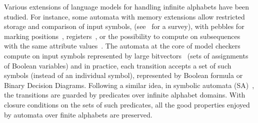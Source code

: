 \documentclass[runningheads]{llncs}
\def\SA{\textsf{SA}\xspace}
\begin{document}
Various extensions of language models for handling infinite alphabets have been studied.
For instance, some automata with memory extensions 
allow restricted storage and comparison of input symbols, 
(see~\cite{Segoufin06csl} for a survey),
with pebbles for marking positions~\cite{NevenSchwentickVianu04FSMinfinite}, 
registers~\cite{KaminskiFrancez94}, 
or %
the possibility to compute on subsequences 
with the same attribute values~\cite{Bojanczyk11FO2}. %
%
The automata at the core of model checkers
compute on input symbols represented by large bitvectors~\cite{Vardi07ciaa} %
(sets of assignments of Boolean variables) %
and in practice,  %
each transition accepts a set of such symbols (instead of an individual symbol), 
represented by Boolean formula or Binary Decision Diagrams.
%
Following a similar idea, %
in symbolic automata (\SA)~\cite{dAntoniVeanes17CAV,dAntoni21CACM}, 
the transitions are guarded by predicates over infinite alphabet domains.
With closure conditions on the sets of such predicates, %
all the good properties enjoyed by automata over finite alphabets are preserved.
\end{document}
